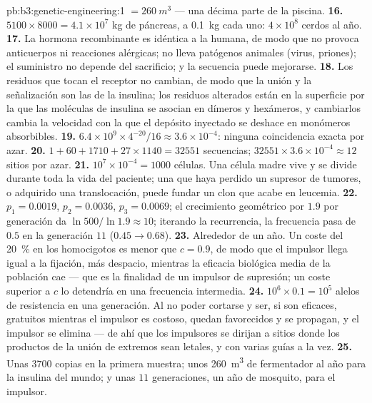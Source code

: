 \begin{solution}{pb:b3:genetic-engineering:1}
$= \qty{260}{m^3}$ --- una décima parte de la piscina.
\textbf{16.} $5100\times 8000 = 4.1\times 10^{7}$ kg de páncreas, a
\qty{0.1}{kg} cada uno: $4\times 10^{8}$ cerdos al año.
\textbf{17.} La hormona recombinante es idéntica a la humana, de modo que
no provoca anticuerpos ni reacciones alérgicas; no lleva patógenos
animales (virus, priones); el suministro no depende del sacrificio; y la
secuencia puede mejorarse.
\textbf{18.} Los residuos que tocan el receptor no cambian, de modo que
la unión y la señalización son las de la insulina; los residuos alterados
están en la superficie por la que las moléculas de insulina se asocian en
dímeros y hexámeros, y cambiarlos cambia la velocidad con la que el
depósito inyectado se deshace en monómeros absorbibles.
\textbf{19.} $6.4\times 10^{9}\times 4^{-20}/16 \approx 3.6\times
10^{-4}$: ninguna coincidencia exacta por azar.
\textbf{20.} $1 + 60 + 1710 + 27\times 1140 = \num{32551}$ secuencias;
$\num{32551}\times 3.6\times 10^{-4} \approx 12$ sitios 
por azar.
\textbf{21.} $10^{7}\times 10^{-4} = 1000$ células. Una célula madre vive
y se divide durante toda la vida del paciente; una que haya perdido un
supresor de tumores, o adquirido una translocación, puede fundar un clon
que acabe en leucemia.
\textbf{22.} $p_{1} = 0.0019$, $p_{2} = 0.0036$, $p_{3} = 0.0069$; el
crecimiento geométrico por $1.9$ por generación da $\ln 500/\ln 1.9
\approx 10$; iterando la recurrencia, la frecuencia pasa de $0.5$ en la
generación $11$ ($0.45 \to 0.68$).
\textbf{23.} Alrededor de un año. Un coste del \qty{20}{\%} en los
homocigotos es menor que $c = 0.9$, de modo que el impulsor llega igual a
la fijación, más despacio, mientras la eficacia biológica media de la
población cae --- que es la finalidad de un impulsor de supresión; un
coste superior a $c$ lo detendría en una frecuencia intermedia.
\textbf{24.} $10^{6}\times 0.1 = 10^{5}$ alelos de resistencia en una
generación. Al no poder cortarse y ser, si son eficaces, gratuitos
mientras el impulsor es costoso, quedan favorecidos y se propagan, y el
impulsor se elimina --- de ahí que los impulsores se dirijan a sitios
donde los productos de la unión de extremos sean letales, y con varias
guías a la vez.
\textbf{25.} Unas $3700$ copias en la primera muestra; unos
\qty{260}{m^3} de fermentador al año para la insulina del mundo; y unas
$11$ generaciones, un año de mosquito, para el impulsor.
\end{solution}
